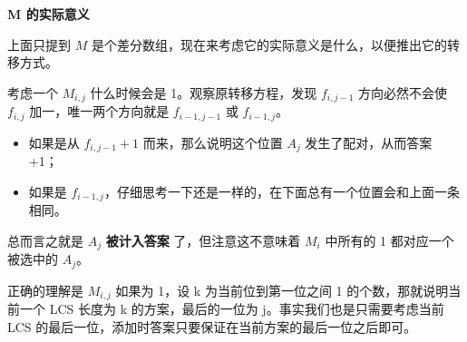 \begin{tcolorbox}

\par \noindent \textbf{M 的实际意义}

\par 上面只提到 $M$ 是个差分数组，现在来考虑它的实际意义是什么，以便推出它的转移方式。

\par 考虑一个 $M_{i,j}$ 什么时候会是 1。观察原转移方程，发现 $f_{i,j-1}$ 方向必然不会使 $f_{i,j}$ 加一，唯一两个方向就是 $f_{i-1,j-1}$ 或 $f_{i-1,j}$。
\begin{itemize}
\item 如果是从 $f_{i,j-1} + 1$ 而来，那么说明这个位置 $A_j$ 发生了配对，从而答案 +1；

\item 如果是 $f_{i-1,j}$，仔细思考一下还是一样的，在下面总有一个位置会和上面一条相同。
\end{itemize}

\par 总而言之就是 $A_j$ \textbf{被计入答案} 了，但注意这不意味着 $M_i$ 中所有的 1 都对应一个被选中的 $A_j$。
~\\
\par 正确的理解是 $M_{i,j}$ 如果为 1，设 k 为当前位到第一位之间 1 的个数，那就说明当前一个 LCS 长度为 k 的方案，最后的一位为 j。事实我们也是只需要考虑当前 LCS 的最后一位，添加时答案只要保证在当前方案的最后一位之后即可。
\end{tcolorbox}

